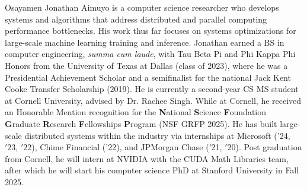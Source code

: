 \begin{biosketch}
Osayamen Jonathan Aimuyo is a computer science researcher who develops systems and algorithms that address distributed
and parallel computing performance bottlenecks.
His work thus far focuses on systems optimizations for large-scale machine learning training and inference.
Jonathan earned a BS in computer engineering, \textit{summa cum laude}, with Tau Beta Pi and Phi Kappa Phi Honors from the
University of Texas at Dallas (class of 2023),
where he was a Presidential Achievement Scholar and a semifinalist
for the national Jack Kent Cooke Transfer Scholarship (2019).
He is currently a second-year CS MS student at Cornell University,
advised by Dr. Rachee Singh.
While at Cornell, he received an Honorable Mention recognition for the
\textbf{N}ational \textbf{S}cience \textbf{F}oundation \textbf{G}raduate \textbf{R}esearch \textbf{F}ellowships
\textbf{P}rogram (NSF GRFP 2025).
He has built large-scale distributed systems within the industry
via internships at Microsoft ('24, \('23\), \('22\)), Chime Financial ('22), and JPMorgan Chase ('21, \('20\)).
Post graduation from Cornell, he will intern at NVIDIA with the CUDA Math Libraries team,
after which he will start his computer science PhD at Stanford University in Fall 2025.
\end{biosketch}